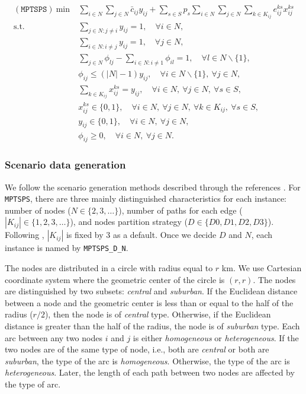 \begin{subequations}
\begin{align}
(\texttt{MPTSPS})\ \textrm{min}\ &\sum_{i\in N}\sum_{j\in N}\bar{c}_{ij}y_{ij}+\sum_{s\in S}p_s\sum_{i\in N}\sum_{j\in N}\sum_{k\in K_{ij}}e_{ij}^{ks}x_{ij}^{ks} \\
\textrm{s.t.}\ &\sum_{j\in N:j\neq i}y_{ij}=1,\quad\forall i\in N,\\
&\sum_{i\in N:i\neq j}y_{ij}=1,\quad\forall j\in N,\\
&\sum_{j\in N}\phi_{lj}-\sum_{i\in N: i\neq 1}\phi_{il}=1,\quad\forall l\in N\backslash\{1\},\\
&\phi_{ij}\le \left(|N|-1\right)y_{ij},\quad\forall i\in N\backslash\{1\},\ \forall j\in N,\\
&\sum_{k\in K_{ij}}x_{ij}^{ks}=y_{ij},\quad\forall i\in N,\ \forall j\in N,\ \forall s\in S, \\
&x_{ij}^{ks}\in\{0,1\},\quad\forall i\in N,\ \forall j\in N,\ \forall k\in K_{ij},\ \forall s\in S,\\
&y_{ij}\in \{0,1\},\quad \forall i\in N,\ \forall j\in N,\\
&\phi_{ij} \ge 0, \quad \forall i\in N,\ \forall j\in N.
\end{align}
\end{subequations}

\subsubsection{Scenario data generation}
We follow the scenario generation methods described through the references \cite{journal:MPT2014,journal:PGM2017,journal:TPP2017}. For \texttt{MPTSPS}, there are three mainly distinguished characteristics for each instance: number of nodes ($N\in\{2,3,\ldots\}$), number of paths for each edge ($|K_{ij}|\in\{1,2,3,\ldots\}$), and nodes partition strategy ($D\in\{D0,D1,D2,D3\}$). Following \cite{journal:TPP2017}, $|K_{ij}|$ is fixed by 3 as a default. Once we decide $D$ and $N$, each instance is named by \texttt{MPTSPS\_D\_N}. 

The nodes are distributed in a circle with radius equal to $r$ km. We use Cartesian coordinate system where the geometric center of the circle is $(r,r)$. The nodes are distinguished by two subsets: \textit{central} and \textit{suburban}. If the Euclidean distance between a node and the geometric center is less than or equal to the half of the radius ($r/2$), then the node is of \textit{central} type. Otherwise, if the Euclidean distance is greater than the half of the radius, the node is of \textit{suburban} type. Each arc between any two nodes $i$ and $j$ is either \textit{homogeneous} or \textit{heterogeneous}. If the two nodes are of the same type of node, i.e., both are \textit{central} or both are \textit{suburban}, the type of the arc is \textit{homogeneous}. Otherwise, the type of the arc is \textit{heterogeneous}. Later, the length of each path between two nodes are affected by the type of arc. 

